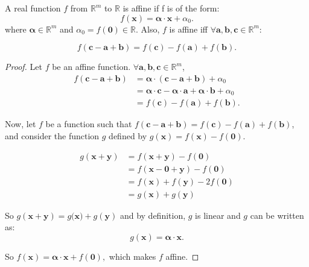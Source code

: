 \begin{property}
  \label{PROPRE:f_affine_real}
  A real function $f$ from $\mathbb{R}^m$ to $\mathbb{R}$ is affine if f is of
  the form: $$f(\mathbf{x}) = \boldsymbol{\alpha} \cdot \mathbf{x} +
  \alpha_0.$$ where $\boldsymbol{\alpha} \in \mathbb{R}^m$ and $\alpha_0  =
  f(\mathbf{0}) \in \mathbb{R}$.
  Also, $f$ is affine iff $\forall \mathbf{a}, \mathbf{b}, \mathbf{c} \in
  \mathbb{R}^m$:

  $$f(\mathbf{c} - \mathbf{a} + \mathbf{b}) = f(\mathbf{c}) - f(\mathbf{a}) +
  f(\mathbf{b}).$$
\end{property}
\begin{proof}
  Let $f$ be an affine function.
  $\forall \mathbf{a}, \mathbf{b}, \mathbf{c} \in \mathbb{R}^m$,
  \begin{align*}
    f(\mathbf{c} - \mathbf{a} + \mathbf{b}) &= \boldsymbol{\alpha} \cdot (\mathbf{c}
    - \mathbf{a} + \mathbf{b}) + \alpha_0\\
    &= \boldsymbol{\alpha} \cdot \mathbf{c} - \boldsymbol{\alpha} \cdot
    \mathbf{a} + \boldsymbol{\alpha} \cdot \mathbf{b} + \alpha_0\\
    &= f(\mathbf{c}) - f(\mathbf{a}) + f(\mathbf{b}).
  \end{align*}

  Now, let $f$ be a function such that $f(\mathbf{c} - \mathbf{a} +
  \mathbf{b}) = f(\mathbf{c}) - f(\mathbf{a}) + f(\mathbf{b})$, and consider
  the function $g$ defined by $g(\mathbf{x}) = f(\mathbf{x}) - f(\mathbf{0}).$

  \begin{align*}
    g(\mathbf{x} + \mathbf{y}) &= f(\mathbf{x} + \mathbf{y}) - f(\mathbf{0})\\
    &= f(\mathbf{x} - \mathbf{0} + \mathbf{y}) - f(\mathbf{0})\\
    &= f(\mathbf{x}) + f(\mathbf{y}) - 2f(\mathbf{0})\\
    &= g(\mathbf{x}) + g(\mathbf{y})
  \end{align*}

  So $g(\mathbf{x} + \mathbf{y}) = g(\mathbf{x)} + g(\mathbf{y})$ and by
  definition, $g$ is linear and $g$ can be written as:
  $$g(\mathbf{x}) = \boldsymbol{\alpha} \cdot \mathbf{x}.$$

  So $f(\mathbf{x}) = \boldsymbol{\alpha} \cdot \mathbf{x} + f(\mathbf{0}),$
  which makes $f$ affine.
\end{proof}


